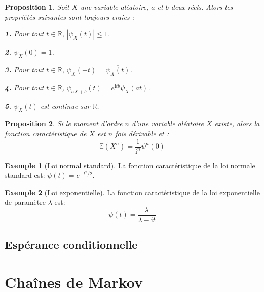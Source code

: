 \documentclass[
]{book}
\newtheorem{proposition}{Proposition}[chapter]
\theoremstyle{definition}
\theoremstyle{definition}
\newtheorem{example}{Exemple}[chapter]
\theoremstyle{definition}
\theoremstyle{remark}
\begin{document}
\begin{proposition}
\protect\hypertarget{prp:unnamed-chunk-17}{}{\label{prp:unnamed-chunk-17} }Soit \(X\) une variable aléatoire, \(a\) et \(b\) deux réels.
Alors les propriétés suivantes sont toujours vraies :

\textbf{1.} Pour tout \(t \in \mathbb{R}\), \(\left|\psi_X(t)\right| \leq 1\).

\textbf{2.} \(\psi_X(0)=1\).

\textbf{3.} Pour tout \(t \in \mathbb{R}\), \(\psi_X(−t) = \overline{\psi_X(t)}\).

\textbf{4.} Pour tout \(t \in \mathbb{R}\), \(\psi_{aX+b}(t) = e^{\mathrm{i}tb} \psi_X(at)\).

\textbf{5.} \(\psi_X(t)\) est continue sur \(\mathbb{R}\).
\end{proposition}

\begin{proposition}
\protect\hypertarget{prp:unnamed-chunk-18}{}{\label{prp:unnamed-chunk-18} }Si le moment d'ordre \(n\) d'une variable aléatoire \(X\) existe, alors la fonction caractéristique de
\(X\) est \(n\) fois dérivable et :
\[
  \mathbb{E}\left({X}^n \right)=\dfrac{1}{{\mathrm{i}}^n}{\psi}^n(0)
  \]
\end{proposition}

\begin{example}[Loi normal standard]
\protect\hypertarget{exm:unnamed-chunk-19}{}{\label{exm:unnamed-chunk-19} {} }La fonction caractéristique de la loi normale standard est: \(\psi(t)={e}^{-t^2/2}\).
\end{example}

\begin{example}[Loi exponentielle]
\protect\hypertarget{exm:unnamed-chunk-20}{}{\label{exm:unnamed-chunk-20} {} }La fonction caractéristique de la loi exponentielle de paramètre \(\lambda\) est:
\[
  \psi(t)=\dfrac{\lambda}{\lambda-\mathrm{i}t}
  \]
\end{example}

\hypertarget{espuxe9rance-conditionnelle}{%
\section{Espérance conditionnelle}\label{espuxe9rance-conditionnelle}}

\hypertarget{chauxeenes-de-markov}{%
\chapter{Chaînes de Markov}\label{chauxeenes-de-markov}}
\end{document}
